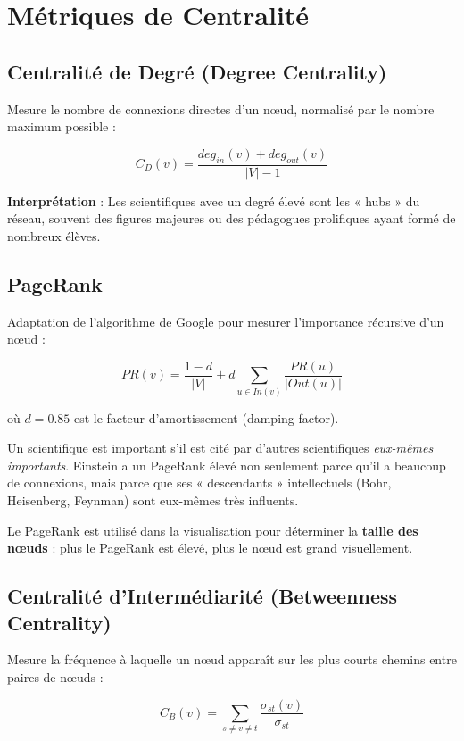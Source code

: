 \documentclass[12pt,a4paper]{report}
\begin{document}
\section{Métriques de Centralité}

\subsection{Centralité de Degré (Degree Centrality)}

Mesure le nombre de connexions directes d'un nœud, normalisé par le nombre maximum possible :

$$C_D(v) = \frac{deg_{in}(v) + deg_{out}(v)}{|V| - 1}$$

\textbf{Interprétation} : Les scientifiques avec un degré élevé sont les « hubs » du réseau, souvent des figures majeures ou des pédagogues prolifiques ayant formé de nombreux élèves.

\subsection{PageRank}

Adaptation de l'algorithme de Google pour mesurer l'importance récursive d'un nœud :

$$PR(v) = \frac{1-d}{|V|} + d \sum_{u \in In(v)} \frac{PR(u)}{|Out(u)|}$$

où $d = 0.85$ est le facteur d'amortissement (damping factor).

\begin{infobox}
Un scientifique est important s'il est cité par d'autres scientifiques \textit{eux-mêmes importants}. Einstein a un PageRank élevé non seulement parce qu'il a beaucoup de connexions, mais parce que ses « descendants » intellectuels (Bohr, Heisenberg, Feynman) sont eux-mêmes très influents.
\end{infobox}

Le PageRank est utilisé dans la visualisation pour déterminer la \textbf{taille des nœuds} : plus le PageRank est élevé, plus le nœud est grand visuellement.

\subsection{Centralité d'Intermédiarité (Betweenness Centrality)}

Mesure la fréquence à laquelle un nœud apparaît sur les plus courts chemins entre paires de nœuds :

$$C_B(v) = \sum_{s \neq v \neq t} \frac{\sigma_{st}(v)}{\sigma_{st}}$$
\end{document}
